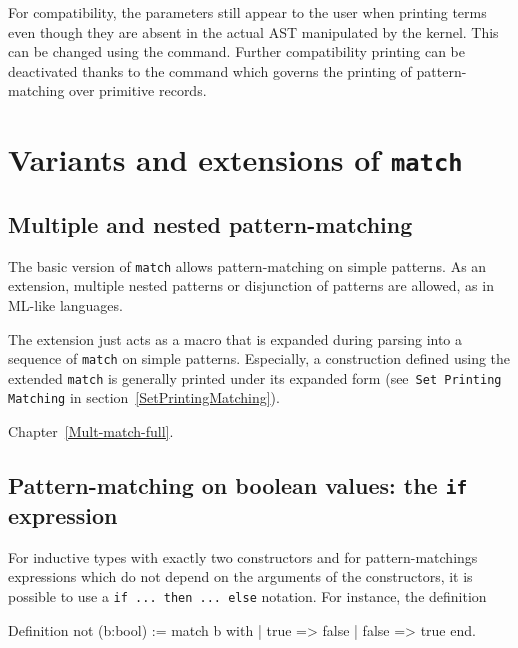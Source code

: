 For compatibility, the parameters still appear to the user when printing terms
even though they are absent in the actual AST manipulated by the kernel. This
can be changed using the {}
command. Further compatibility printing can be deactivated thanks to the
{} command which governs the
printing of pattern-matching over primitive records.

\section{Variants and extensions of {\mbox{\tt match}}
\label{Extensions-of-match}
}

\subsection{Multiple and nested pattern-matching
\label{Mult-match}}

The basic version of \verb+match+ allows pattern-matching on simple
patterns. As an extension, multiple nested patterns or disjunction of
patterns are allowed, as in ML-like languages.

The extension just acts as a macro that is expanded during parsing
into a sequence of {\tt match} on simple patterns. Especially, a
construction defined using the extended {\tt match} is generally
printed under its expanded form (see~\texttt{Set Printing Matching} in
section~\ref{SetPrintingMatching}).

\SeeAlso Chapter~\ref{Mult-match-full}.

\subsection{Pattern-matching on boolean values: the {\tt if} expression
\label{if-then-else}
}

For inductive types with exactly two constructors and for
pattern-matchings expressions which do not depend on the arguments of
the constructors, it is possible to use a {\tt if ... then ... else}
notation. For instance, the definition

\begin{coq_example}
Definition not (b:bool) :=
  match b with
  | true => false
  | false => true
  end.
\end{coq_example}

